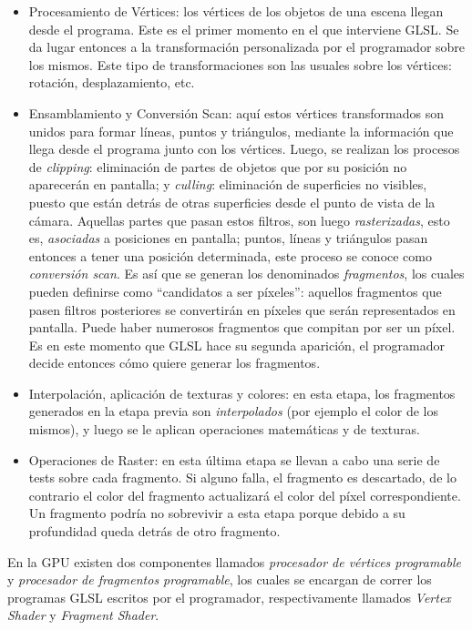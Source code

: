 \begin{itemize}
\item Procesamiento de V\'ertices: los v\'ertices de los objetos de una escena llegan desde el programa. Este es el primer momento en el que interviene GLSL. Se da lugar entonces a la transformaci\'on personalizada por el programador sobre los mismos. Este tipo de transformaciones son las usuales sobre los v\'ertices: rotaci\'on, desplazamiento, etc.
\item Ensamblamiento y Conversi\'on Scan: aqu\'i estos v\'ertices transformados son unidos para formar l\'ineas, puntos y tri\'angulos, mediante la informaci\'on que llega desde el programa junto con los v\'ertices. Luego, se realizan los procesos de {\em clipping}: eliminaci\'on de partes de objetos que por su posici\'on no aparecer\'an en pantalla; y {\em culling}: eliminaci\'on de superficies no visibles, puesto que est\'an detr\'as de otras superficies desde el punto de vista de la c\'amara. Aquellas partes que pasan estos filtros, son luego {\em rasterizadas}, esto es, {\em asociadas} a posiciones en pantalla; puntos, l\'ineas y tri\'angulos pasan entonces a tener una posici\'on determinada, este proceso se conoce como {\em conversi\'on scan}. Es as\'i que se generan los denominados {\em fragmentos}, los cuales pueden definirse como ``candidatos a ser p\'ixeles'': aquellos fragmentos que pasen filtros posteriores se convertir\'an en p\'ixeles que ser\'an representados en pantalla. Puede haber numerosos fragmentos que compitan por ser un p\'ixel. Es en este momento que GLSL hace su segunda aparici\'on, el programador decide entonces c\'omo quiere generar los fragmentos.
\item Interpolaci\'on, aplicaci\'on de texturas y colores: en esta etapa, los fragmentos generados en la etapa previa son {\em interpolados} (por ejemplo el color de los mismos), y luego se le aplican operaciones matem\'aticas y de texturas.
\item Operaciones de Raster: en esta \'ultima etapa se llevan a cabo una serie de tests sobre cada fragmento. Si alguno falla, el fragmento es descartado, de lo contrario el color del fragmento actualizar\'a el color del p\'ixel correspondiente. Un fragmento podr\'ia no sobrevivir a esta etapa porque debido a su profundidad queda detr\'as de otro fragmento.
\end{itemize}

En la GPU existen dos componentes llamados {\em procesador de v\'ertices programable} y {\em procesador de fragmentos programable}, los cuales se encargan de correr los programas GLSL escritos por el programador, respectivamente llamados {\em Vertex Shader} y {\em Fragment Shader}.

